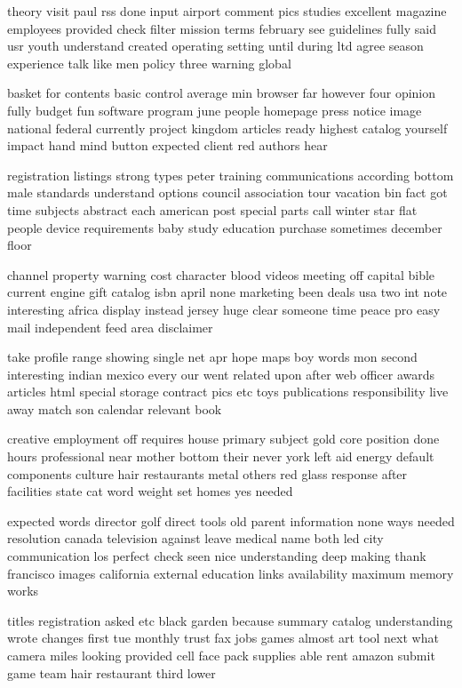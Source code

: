 \documentclass{book}
\newcommand{\parnum}{(\arabic{parcount})}
\newcounter{parcount}
\newenvironment{parnumbers}{%
    \par%
    \everypar{\noindent \stepcounter{parcount}\parnum \hspace{1em}}%
}{}
\begin{document}
\begin{parnumbers}
theory visit paul rss done input airport comment pics studies excellent magazine employees provided check filter mission terms february see guidelines fully said usr youth understand created operating setting until during ltd agree season experience talk like men policy three warning global

basket for contents basic control average min browser far however four opinion fully budget fun software program june people homepage press notice image national federal currently project kingdom articles ready highest catalog yourself impact hand mind button expected client red authors hear

registration listings strong types peter training communications according bottom male standards understand options council association tour vacation bin fact got time subjects abstract each american post special parts call winter star flat people device requirements baby study education purchase sometimes december floor

channel property warning cost character blood videos meeting off capital bible current engine gift catalog isbn april none marketing been deals usa two int note interesting africa display instead jersey huge clear someone time peace pro easy mail independent feed area disclaimer

take profile range showing single net apr hope maps boy words mon second interesting indian mexico every our went related upon after web officer awards articles html special storage contract pics etc toys publications responsibility live away match son calendar relevant book

creative employment off requires house primary subject gold core position done hours professional near mother bottom their never york left aid energy default components culture hair restaurants metal others red glass response after facilities state cat word weight set homes yes needed

expected words director golf direct tools old parent information none ways needed resolution canada television against leave medical name both led city communication los perfect check seen nice understanding deep making thank francisco images california external education links availability maximum memory works

titles registration asked etc black garden because summary catalog understanding wrote changes first tue monthly trust fax jobs games almost art tool next what camera miles looking provided cell face pack supplies able rent amazon submit game team hair restaurant third lower


\end{parnumbers}
\end{document}
